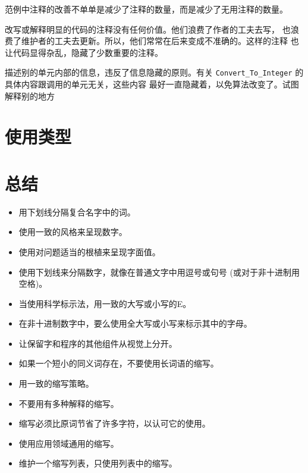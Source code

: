 \begin{blockindent}
范例中注释的改善不单单是减少了注释的数量，而是减少了无用注释的数量。

改写或解释明显的代码的注释没有任何价值。他们浪费了作者的工夫去写，
也浪费了维护者的工夫去更新。所以，他们常常在后来变成不准确的。这样的注释
也让代码显得杂乱，隐藏了少数重要的注释。

描述别的单元内部的信息，违反了信息隐藏的原则。有关
\texttt{Convert\_To\_Integer} 的具体内容跟调用的单元无关，这些内容
最好一直隐藏着，以免算法改变了。试图解释别的地方
\end{blockindent}


\section{使用类型}

\section{总结}
\noindent
\begin{itemize}
    \item 用下划线分隔复合名字中的词。
    \item 使用一致的风格来呈现数字。
    \item 使用对问题适当的根植来呈现字面值。
    \item 使用下划线来分隔数字，就像在普通文字中用逗号或句号
(或对于非十进制用空格)。
    \item 当使用科学标示法，用一致的大写或小写的E。
    \item 在非十进制数字中，要么使用全大写或小写来标示其中的字母。
    \item 让保留字和程序的其他组件从视觉上分开。
    \item 如果一个短小的同义词存在，不要使用长词语的缩写。
    \item 用一致的缩写策略。
    \item 不要用有多种解释的缩写。
    \item 缩写必须比原词节省了许多字符，以认可它的使用。
    \item 使用应用领域通用的缩写。
    \item 维护一个缩写列表，只使用列表中的缩写。
\end{itemize}

